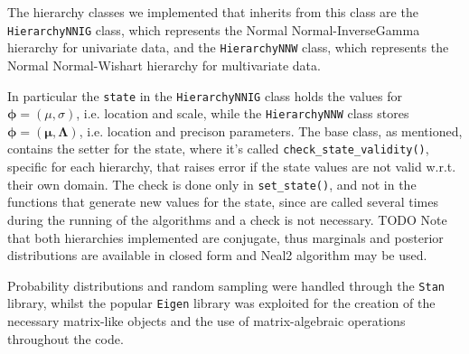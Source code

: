 \begin{itemize}
The hierarchy classes we implemented that inherits from this class are the \verb|HierarchyNNIG| class, which represents the Normal Normal-InverseGamma hierarchy for univariate data, and the \verb|HierarchyNNW| class, which represents the Normal Normal-Wishart hierarchy for multivariate data.

In particular the \verb|state| in the \verb|HierarchyNNIG| class holds the values for $\boldsymbol\phi = (\mu,\sigma)$, i.e.  location and scale, while the \verb|HierarchyNNW| class stores $\boldsymbol\phi = (\mathbf{\mu},\mathbf{\Lambda})$, i.e. location and precison parameters.
The base class, as mentioned, contains the setter for the state, where it’s called \verb|check_state_validity()|, specific for each hierarchy, that raises error if the state values are not valid w.r.t. their own domain.
The check is done only in \verb|set_state()|, and not in the functions that generate new values for the state, since are called several times during the running of the algorithms and a check is not necessary. TODO
Note that both hierarchies implemented are conjugate, thus marginals and
posterior distributions are available in closed form and Neal2 algorithm may be used. \
	
\end{itemize}

Probability distributions and random sampling were handled through the \verb|Stan| library, whilst the popular \verb|Eigen| library was exploited for the creation of the necessary matrix-like objects and the use of matrix-algebraic operations throughout the code.